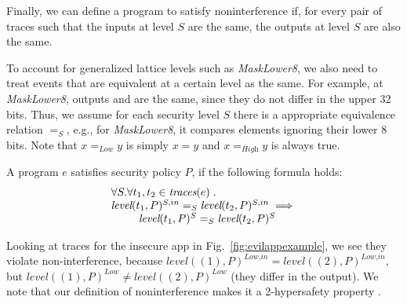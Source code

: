 \documentclass{entcs} \usepackage{entcsmacro}
\newcommand{\code}[1]{\text{\lstinline!#1!}}
\newcommand{\traces}{\textit{traces}}
\newcommand{\tr}{t\xspace}
\newcommand{\tset}{\ensuremath{\mathcal{T}}\xspace}
\newcommand{\tleveltr}[2]{\textit{level}(#1, #2)}
\begin{document}
Finally, we can define a program to satisfy noninterference if, for
every pair of traces such that the inputs at level $S$ are the same,
the outputs at level $S$ are also the same.

To account for generalized lattice levels such as \textit{MaskLower8},
we also need to treat events that are equivalent at a certain level as
the same. For example, at \textit{MaskLower8}, outputs
\code{0xffffffff} and \code{0xffffff00} are the same, since they do
not differ in the upper 32 bits. Thus, we assume for each security
level $S$ there is a appropriate equivalence relation $=_S$, e.g., for
\textit{MaskLower8}, it compares elements ignoring their lower 8
bits. Note that $x =_\textit{Low} y$ is simply $x = y$ and
$x =_\textit{High} y$ is always true.

\begin{definition}[Noninterference]
  \label{defn:noninterference}
  A program $e$ satisfies security policy $P$, if the following formula
  holds:
\begin{displaymath}
  \begin{array}{c}
    \multicolumn{1}{l}{\forall S. \forall t_1, t_2 \in
      \traces(e)\;.} \\
    \tleveltr{\tr_1}{P}^{S,in} =_S \tleveltr{\tr_2}{P}^{S,in}
    \implies \\
    ~~\tleveltr{\tr_1}{P}^S =_S \tleveltr{\tr_2}{P}^S  \\
  \end{array}
\end{displaymath}
\end{definition}

Looking at traces for the insecure app in Fig.~\ref{fig:evilappexample},
we see they violate non-interference, because 
$\tleveltr{(1)}{P}^\textit{Low,in} =
\tleveltr{(2)}{P}^\textit{Low,in}$,
but
$\tleveltr{(1)}{P}^\textit{Low} \neq \tleveltr{(2)}{P}^\textit{Low}$
(they differ in the output).  We note that our definition of
noninterference makes it a 2-hypersafety property \cite{Clarkson:10}.

  

\end{document}
